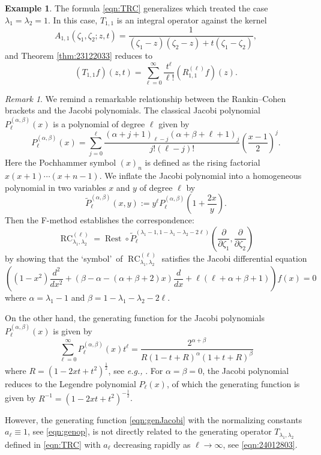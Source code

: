 \documentclass[12pt]{amsart}
\newcommand{\RC}{\operatorname{RC}}
\theoremstyle{plain} %
\theoremstyle{definition} %
\newtheorem{example}{Example} %
\theoremstyle{remark} %
\newtheorem{remark}{Remark} %
\begin{document}
\begin{example}
The formula \eqref{eqn:TRC} generalizes \cite[Thm.\ 2.3]{KPgen}
 which treated the case $\lambda_1=\lambda_2=1$.  
In this case, 
 $T_{1,1}$ is an integral operator 
 against the kernel
\[
   A_{1, 1}(\zeta_1, \zeta_2;z, t)
=
  \frac
  {1}
  {(\zeta_1-z) (\zeta_2-z)+t(\zeta_1-\zeta_2)}, 
\]
 and Theorem \ref{thm:23122033} reduces to 
\[
  (T_{1,1}f)(z,t)
  =\sum_{\ell=0}^{\infty} \frac{t^{\ell}}{\ell !}(R_{1,1}^{(\ell)} f)(z).  
\]
\end{example}

\begin{remark}
\label{rem:231226}
We remind a remarkable relationship 
 between the Rankin--Cohen brackets 
 and the Jacobi polynomials.  
The classical Jacobi polynomial $P_{\ell}^{(\alpha, \beta)}(x)$ is a polynomial 
 of degree $\ell$ given by 
\[
   P_{\ell}^{(\alpha, \beta)}(x)
   =
  \sum_{j=0}^{\ell} \frac{(\alpha+j+1)_{\ell-j}(\alpha+\beta+\ell+1)_{j}}{j! (\ell-j)!}
\left(\frac{x-1}2\right)^j. 
\]
Here the Pochhammer symbol $(x)_n$ is defined
 as the rising factorial $x(x+1) \cdots (x+n-1)$.  
We inflate the Jacobi polynomial 
 into a homogeneous polynomial in two variables $x$ and $y$
 of degree $\ell$ by 
\[
  \widetilde P_{\ell}^{(\alpha, \beta)}(x,y)
  :=
  y^{\ell} P_{\ell}^{(\alpha, \beta)}(1+\frac{2x}y).
\]  
Then the F-method \cite[Lem.\ 9.4]{KP2}
 establishes the correspondence:
\begin{equation}
\label{eqn:RCJacobi}
  \RC_{\lambda_1, \lambda_2}^{(\ell)}
  =
  \operatorname{Rest} \circ \widetilde P_{\ell}^{(\lambda_1-1, 1-\lambda_1-\lambda_2-2\ell)}(\frac{\partial}{\partial \zeta_1}, \frac{\partial}{\partial \zeta_2})
\end{equation}
 by showing that the \lq{symbol}\rq\ of $\RC_{\lambda_1, \lambda_2}^{(\ell)}$ satisfies
 the Jacobi differential equation
\[
  ((1-x^2)\frac{d^2}{d x^2} + (\beta-\alpha - (\alpha+\beta+2)x) \frac{d} {d x} + \ell(\ell+\alpha+\beta+1))f(x)=0
\]
where $\alpha=\lambda_1-1$ and $\beta=1-\lambda_1-\lambda_2-2\ell$.  



On the other hand, 
 the generating function for the Jacobi polynomials
 $P_{\ell}^{(\alpha, \beta)}(x)$ is given by
\begin{equation}
\label{eqn:genJacobi}
\sum_{\ell=0}^{\infty} P_{\ell}^{(\alpha, \beta)}(x)t^{\ell}
  =
 \frac{2^{\alpha+\beta}}{R(1-t+R)^{\alpha}(1+t+R)^{\beta}}
\end{equation}
where $R=(1-2xt + t^2)^{\frac 1 2}$, 
 see {\it{e.g.,}} \cite[Thm.\ 6.4.2]{AAR}.  
For $\alpha=\beta=0$, 
 the Jacobi polynomial reduces to the Legendre polynomial $P_{\ell}(x)$, 
 of which the generating function is 
 given by $R^{-1}=(1-2 x t + t^2)^{-\frac 1 2}$.  



However, 
 the generating function \eqref{eqn:genJacobi}
 with the normalizing constants $a_{\ell} \equiv 1$, 
 see \eqref{eqn:genop}, 
 is not directly related
 to the generating operator $T_{\lambda_1, \lambda_2}$
 defined in \eqref{eqn:TRC}
 with $a_{\ell}$ decreasing rapidly as $\ell \to \infty$, 
 see \eqref{eqn:24012803}.  
\end{remark}
\end{document}
